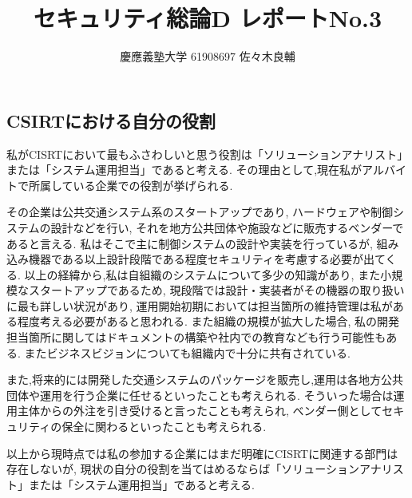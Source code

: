 \documentclass[uplatex,a4j,11pt,dvipdfmx]{jsarticle}
\begin{document}
\title{セキュリティ総論D レポートNo.3}
\author{慶應義塾大学 61908697 佐々木良輔}
\date{}
\maketitle
\subsection*{CSIRTにおける自分の役割}
私がCISRTにおいて最もふさわしいと思う役割は「ソリューションアナリスト」または「システム運用担当」であると考える.
その理由として,現在私がアルバイトで所属している企業での役割が挙げられる.

その企業は公共交通システム系のスタートアップであり,
ハードウェアや制御システムの設計などを行い,
それを地方公共団体や施設などに販売するベンダーであると言える.
私はそこで主に制御システムの設計や実装を行っているが,
組み込み機器である以上設計段階である程度セキュリティを考慮する必要が出てくる.
以上の経緯から,私は自組織のシステムについて多少の知識があり,
また小規模なスタートアップであるため,
現段階では設計・実装者がその機器の取り扱いに最も詳しい状況があり,
運用開始初期においては担当箇所の維持管理は私がある程度考える必要があると思われる.
また組織の規模が拡大した場合,
私の開発担当箇所に関してはドキュメントの構築や社内での教育なども行う可能性もある.
またビジネスビジョンについても組織内で十分に共有されている.

また,将来的には開発した交通システムのパッケージを販売し,運用は各地方公共団体や運用を行う企業に任せるといったことも考えられる.
そういった場合は運用主体からの外注を引き受けると言ったことも考えられ,
ベンダー側としてセキュリティの保全に関わるといったことも考えられる.

以上から現時点では私の参加する企業にはまだ明確にCISRTに関連する部門は存在しないが,
現状の自分の役割を当てはめるならば「ソリューションアナリスト」または「システム運用担当」であると考える.
\end{document}

